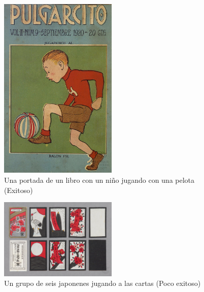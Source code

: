 \begin{figure}[h!]
    \centering
    \includegraphics[width=0.5\textwidth]{Graphics/una portada de un libro con un ninho jugando con una pelota.jpg}
    \caption{Una portada de un libro con un niño jugando con una pelota (Exitoso)}
\end{figure}


\begin{figure}[h]
    \centering
    \includegraphics[width=0.5\textwidth]{Graphics/un grupo de seis japonenes jugando a las cartas.jpg}
        \caption{Un grupo de seis japonenes jugando a las cartas (Poco exitoso)}
    \end{figure}
    
